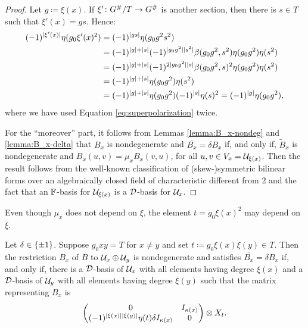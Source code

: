 \begin{proof}
    Let $g \coloneqq \xi(x)$. If $\xi' \colon G^\#/T \to G^\#$ is another section, then there is $s \in T$ such that $\xi' (x) = g s$. 
    Hence:
    \begin{align*}
        (-1)^{|\xi' (x)|} \eta(g_0 \xi' (x)^2) &= (-1)^{|gs|} \eta(g_0 g^2 s^2)\\
        &= (-1)^{|g| + |s|} (-1)^{|g_0 g^2||s^2|} \beta(g_0 g^2, s^2)\eta(g_0 g^2) \eta(s^2)\\
        &= (-1)^{|g| + |s|} (-1)^{2 |g_0 g^2| |s|} \beta(g_0 g^2, s)^2 \eta(g_0 g^2) \eta(s^2) \\
        &= (-1)^{|g| + |s|} \eta(g_0 g^2) \eta(s^2) \\ 
        &= (-1)^{|g| + |s|} \eta(g_0 g^2) (-1)^{|s|} \eta (s)^2 = (-1)^{|g|} \eta(g_0 g^2),
    \end{align*}
    where we have used Equation \eqref{eq:superpolarization} twice. 
    
    For the ``moreover'' part, it follows from Lemmas \ref{lemma:B_x-nondeg} and \ref{lemma:B_x-delta} that $B_x$ is nondegenerate and $\overline{B_x} = \delta B_x$ if, and only if, $\tilde B_x$ is nondegenerate and $B_x (u,v) = \mu_x B_x(v, u)$, for all $u,v \in V_x = \mathcal U_{\xi(x)}$. 
    Then the result follows from the well-known classification of (skew-)symmetric bilinear forms over an algebraically closed field of characteristic different from $2$ and the fact that an $\mathbb{F}$-basis for $\mathcal U_{\xi(x)}$ is a $\mathcal{D}$-basis for $\mathcal U_x$.
\end{proof}

\begin{remark}
    Even though $\mu_{x}$ does not depend on $\xi$, the element $t = g_0\xi(x)^2$ may depend on $\xi$.
\end{remark}

\begin{prop}\label{prop:pair-of-dual-components}
    Let $\delta \in \{ \pm 1 \}$. 
    Suppose $g_0 x y = T$ for $x\neq y$ and set $t \coloneqq g_0\xi(x)\xi(y) \in T$. 
    Then the restriction $B_x$ of $B$ to $\mathcal U_x \oplus \mathcal U_y$ is nondegenerate and satisfies $\overline{B_x} = \delta B_x$ if, and only if, there is a $\mathcal{D}$-basis of $\mathcal U_x$ with all elements having degree $\xi(x)$ and a $\mathcal{D}$-basis of $\mathcal U_y$ with all elements having degree $\xi(y)$ such that the matrix representing $B_x$ is
    \[
        \begin{pmatrix}
            0 & I_{\kappa(x)}\\
            (-1)^{|\xi(x)||\xi(y)|} \eta(t) \delta I_{\kappa(x)} & 0
        \end{pmatrix} \otimes X_t. 
    \]
\end{prop}

